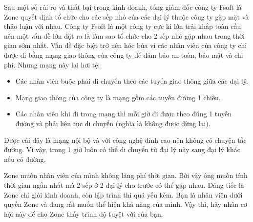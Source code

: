 Sau một số rủi ro và thất bại trong kinh doanh, tổng giám đốc công ty Fsoft là Zone quyết định tổ chức cho các sếp nhỏ của các đại lý thuộc công ty gặp mặt và thảo luận với nhau. Công ty Fsoft là một công ty cực kì lớn trải khắp toàn cầu nên một vấn đề lớn đặt ra là làm sao tổ chức cho 2 sếp nhỏ gặp nhau trong thời gian sớm nhất. Vấn đề đặc biệt trở nên hóc búa vì các nhân viên của công ty chỉ được đi bằng mạng giao thông của công ty để đảm bảo an toàn, bảo mật và chi phí. Nhưng mạng này lại hơi tệ:
\begin{itemize}
	\item Các nhân viên buộc phải di chuyển theo các tuyến giao thông giữa các đại lý.
	\item Mạng giao thông của công ty là mạng gồm các tuyến đường 1 chiều.
	\item Các nhân viên khi đi trong mạng thì mỗi giờ đi được theo đúng 1 tuyến đường và phải liên tục di chuyển (nghĩa là không được dừng lại).
\end{itemize}

Được cái đây là mạng nội bộ và với công nghệ đỉnh cao nên không có chuyện tắc đường. Vì vậy, trong 1 giờ luôn có thể di chuyển từ đại lý này sang đại lý khác nếu có đường.

Zone muốn nhân viên của mình không lãng phí thời gian. Bởi vậy ông muốn tính thời gian ngắn nhất mà 2 sếp ở 2 đại lý cho trước có thể gặp nhau. Đáng tiếc là Zone chỉ giỏi kinh doanh, còn lập trình thì quá yếu kém. Bạn là nhân viên dưới quyền Zone và đang rất muốn thể hiện khả năng của mình. Vậy thì, hãy nhân cơ hội này để cho Zone thấy trình độ tuyệt vời của bạn.